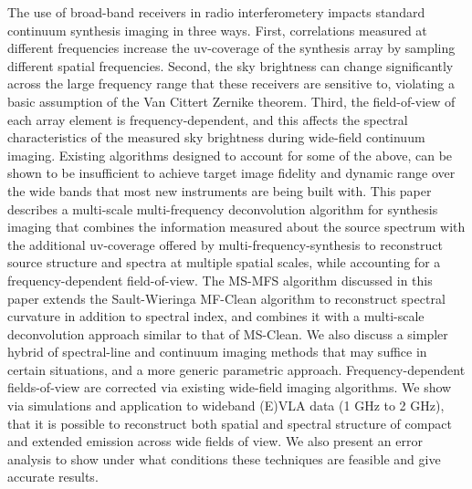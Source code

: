 \documentclass[structabstract]{aa}
\begin{document}
  \abstract
   {The use of broad-band receivers in radio interferometery impacts standard continuum
    synthesis imaging in three ways. 
    First, correlations measured at different frequencies increase the uv-coverage of
    the synthesis array by sampling different spatial frequencies.
    Second, the sky brightness can change significantly across the large frequency 
    range that these receivers are sensitive to, violating a basic assumption of the
    Van Cittert Zernike theorem.  
    Third, the field-of-view of each array element is frequency-dependent, and this
    affects the spectral characteristics of the measured sky brightness during wide-field
    continuum imaging.
    Existing algorithms designed to account for some of the above, can be shown to be
    insufficient to achieve target image fidelity and dynamic range over the wide bands that 
    most new instruments are being built with.}
   {This paper describes a multi-scale multi-frequency deconvolution algorithm for
    synthesis imaging that combines the information measured about the source spectrum
    with the additional uv-coverage offered by multi-frequency-synthesis to 
    reconstruct source structure and spectra at multiple spatial scales, %
    while accounting for a frequency-dependent field-of-view.}
   {The MS-MFS algorithm discussed in this paper extends the Sault-Wieringa MF-Clean 
    algorithm to reconstruct spectral curvature in addition to spectral index,
    and combines it with a  multi-scale deconvolution approach similar to that of MS-Clean.
    We also discuss a simpler hybrid of spectral-line and continuum imaging methods
    that may suffice in certain situations, and a more generic parametric approach.
    Frequency-dependent fields-of-view are corrected via existing wide-field imaging
    algorithms.
   }
   {We show via simulations and application to wideband (E)VLA data (1 GHz to 2 GHz),
    that it is possible to reconstruct both spatial and spectral structure of 
    compact and extended emission across wide fields of view.
    We also present an error analysis to show
    under what conditions these techniques are feasible and give accurate results. %
   }
   {}

\end{document}
